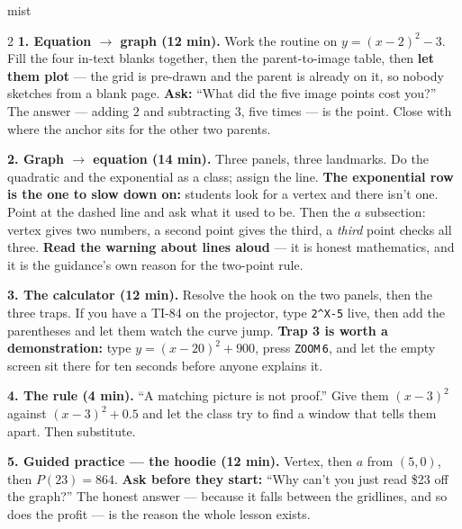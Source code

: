 \documentclass[10pt]{article}
\begin{document}
\boxguard
\begin{skillbox}[Lesson]{mist}
\begin{multicols}{2}
\textbf{1. Equation $\to$ graph (12 min).} Work the routine on $y=(x-2)^2-3$. Fill the four in-text
blanks together, then the parent-to-image table, then \textbf{let them plot} --- the grid is
pre-drawn and the parent is already on it, so nobody sketches from a blank page. \textbf{Ask:} ``What
did the five image points cost you?'' The answer --- adding $2$ and subtracting $3$, five times --- is
the point. Close with where the anchor sits for the other two parents.

\textbf{2. Graph $\to$ equation (14 min).} Three panels, three landmarks. Do the quadratic and the
exponential as a class; assign the line. \textbf{The exponential row is the one to slow down on:}
students look for a vertex and there isn't one. Point at the dashed line and ask what it used to be.
Then the $a$ subsection: vertex gives two numbers, a second point gives the third, a \emph{third}
point checks all three. \textbf{Read the warning about lines aloud} --- it is honest mathematics, and
it is the guidance's own reason for the two-point rule.

\textbf{3. The calculator (12 min).} Resolve the hook on the two panels, then the three traps. If
you have a TI-84 on the projector, type \texttt{2\^{}X-5} live, then add the parentheses and let them
watch the curve jump. \textbf{Trap 3 is worth a demonstration:} type $y=(x-20)^2+900$, press
\texttt{ZOOM}\,\texttt{6}, and let the empty screen sit there for ten seconds before anyone explains
it.

\textbf{4. The rule (4 min).} ``A matching picture is not proof.'' Give them $(x-3)^2$ against
$(x-3)^2+0.5$ and let the class try to find a window that tells them apart. Then substitute.

\textbf{5. Guided practice --- the hoodie (12 min).} Vertex, then $a$ from $(5,0)$, then $P(23)=864$.
\textbf{Ask before they start:} ``Why can't you just read \$23 off the graph?'' The honest answer ---
because it falls between the gridlines, and so does the profit --- is the reason the whole lesson
exists.
\end{multicols}
\end{skillbox}
\end{document}
